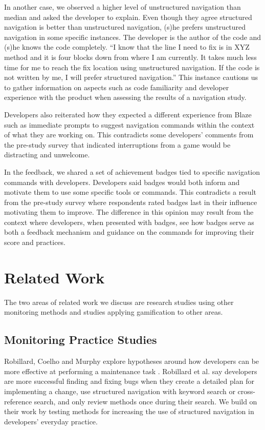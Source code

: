\documentclass{sig-alternate}
\begin{document}
In another case, we observed a higher level of unstructured navigation than median and asked the developer to explain.  Even though they agree  structured navigation is better than unstructured navigation, (s)he prefers unstructured navigation in some specific instances. The developer is the author of the code and (s)he knows the code completely. ``I know that the line I need to fix is in XYZ method and it is four blocks down from where I am currently. It takes much less time for me to reach the fix location using unstructured navigation. If the code is not written by me, I will prefer structured navigation.'' This instance cautions us to gather information on aspects such as code familiarity and developer experience with the product when assessing the results of a navigation study.

Developers also reiterated how they expected a different experience from Blaze  such as immediate prompts to suggest navigation commands within the context of what they are working on.  This contradicts some developers' comments from the pre-study survey that indicated interruptions from a game would be distracting and unwelcome.

In the feedback, we shared a set of achievement badges tied to specific navigation commands with developers.   Developers said badges would both inform and motivate them to use some specific tools or commands.   This contradicts a result from the pre-study survey where respondents rated badges last in their influence motivating them to improve.  The difference in this opinion may result from the context where developers, when presented with badges, see how badges serve as both a feedback mechanism and guidance on the commands for improving their score and practices.

\section{Related Work}
\label{sec:RelatedWork}
The two areas of related work we discuss are research studies using other monitoring methods and studies applying gamification to other areas.

\subsection{Monitoring Practice Studies}

Robillard, Coelho and Murphy explore hypotheses around how developers can be more effective at performing a maintenance task \cite{wbsnipes:Robillard2004How}.  Robillard et al. say developers are more successful finding and fixing bugs when they create a detailed plan for implementing a change, use structured navigation with keyword search or cross-reference search, and only review methods once during their search.  We build on their work by testing methods for increasing the use of structured navigation in developers' everyday practice.
\end{document}
